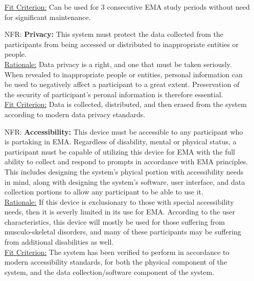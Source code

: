 \documentclass[12pt]{article}
\newcounter{nfrnum} %
\begin{document}
\begin{itemize}
\underline{Fit Criterion:} Can be used for 3 consecutive EMA study periods without need for significant maintenance.\\

\item[NFR\refstepcounter{nfrnum}\thenfrnum \label{NFR_Privacy}:]
  \textbf{Privacy:} This system must protect the data collected from the participants from being accessed or distributed to inappropriate entities or people. \\


\underline{Rationale:} Data privacy is a right, and one that must be taken seriously. When revealed to inappropriate people or entities, personal information can be used to negatively affect a participant to a great extent. Preservation of the security of participant's peronal information is therefore essential.\\

\underline{Fit Criterion:} Data is collected, distributed, and then erased from the system according to modern data privacy standards.\\

\item[NFR\refstepcounter{nfrnum}\thenfrnum \label{NFR_Accessibility}:]
  \textbf{Accessibility:} This device must be accessible to any participant who is partaking in EMA. Regardless of disability, mental or physical status, a participant must be capable of utilizing this device for EMA with the full ability to collect and respond to prompts in accordance with EMA principles. This includes designing the system's phyical portion with accessibility needs in mind, along with designing the system's software, user interface, and data collection portions to allow any participant to be able to use it.\\

\underline{Rationale:} If this device is exclusionary to those with special accessibility needs, then it is severly limited in its use for EMA. According to the user characteristics, this device will mostly be used for those suffering from musculo-skeletal disorders, and many of these participants may be suffering from additional disabilities as well.\\

\underline{Fit Criterion:} The system has been verified to perform in accordance to modern accessibility standards, for both the physical component of the system, and the data collection/software component of the system.\\


\end{itemize}
\end{document}
